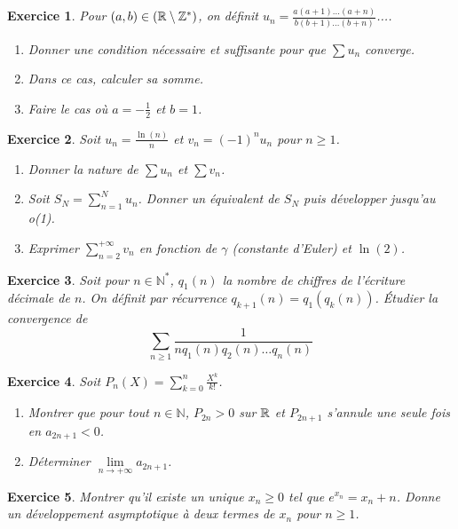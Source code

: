 \documentclass[12pt]{article}
\newtheorem{exercise}{Exercice}[section]
\theoremstyle{remark}
\theoremstyle{remark}
\newcommand{\N}{\mathbb{N}} \newcommand{\Z}{\mathbb{Z}}
\begin{document}
\begin{exercise}
	Pour $(a,b)\in(\R\setminus\Z^{*})$, on définit
	$u_{n}=\frac{a(a+1)\dots(a+n)}{b(b+1)\dots(b+n)}$....
	\begin{enumerate}
		\item
		Donner une condition nécessaire et suffisante pour que $\sum u_{n}$
		converge.
		\item
		Dans ce cas, calculer sa somme.
		\item
		Faire le cas où $a=-\frac{1}{2}$ et $b=1$.
	\end{enumerate}
\end{exercise}

\begin{exercise}
	Soit $u_{n}=\frac{\ln(n)}{n}$ et $v_{n}=(-1)^{n}u_{n}$ pour $n\geqslant1$.
	\begin{enumerate}
		\item
		Donner la nature de $\sum u_{n}$ et $\sum v_{n}$.
		\item
		Soit $S_{N}=\sum_{n=1}^{N}u_{n}$. Donner un équivalent de $S_{N}$ puis
		développer jusqu'au o(1).
		\item
		Exprimer $\sum_{n=2}^{+\infty}v_{n}$ en fonction de $\gamma$ (constante
		d'Euler) et $\ln(2)$.
	\end{enumerate}
\end{exercise}

\begin{exercise}
	Soit pour $n\in\N^{*}$, $q_{1}(n)$ la nombre de chiffres de l'écriture
	décimale de $n$. On définit par récurrence $q_{k+1}(n)=q_{1}(q_{k}(n))$.
	Étudier la convergence de 
	$$\sum_{n\geqslant1}\frac{1}{nq_{1}(n)q_{2}(n)\dots q_{n}(n)}$$
\end{exercise}

\begin{exercise}
	Soit $P_{n}(X)=\sum_{k=0}^{n}\frac{X^{k}}{k!}$.
	\begin{enumerate}
		\item
		Montrer que pour tout $n\in\N$, $P_{2n}>0$ sur $\mathbb{R}$ et $P_{2n+1}$ s'annule
		une seule fois en $a_{2n+1}<0$.
		\item
		Déterminer $\lim\limits_{n\to+\infty}a_{2n+1}$.
	\end{enumerate}
\end{exercise}

\begin{exercise}
	Montrer qu'il existe un unique $x_{n}\geqslant0$ tel que $e^{x_{n}}=x_{n}+n$.
	Donne un développement asymptotique à deux termes de $x_{n}$ pour
	$n\geqslant1$.
\end{exercise}
\end{document}
